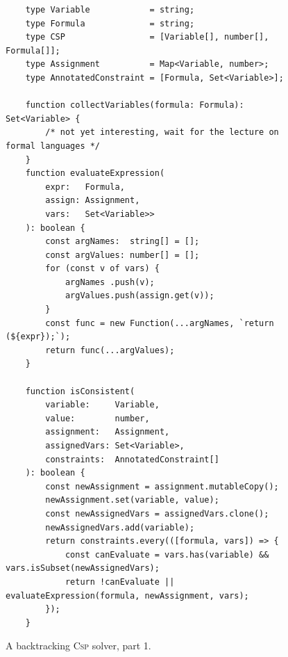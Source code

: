 \begin{figure}[!ht]
\centering
\begin{verbatim}
    type Variable            = string;
    type Formula             = string;
    type CSP                 = [Variable[], number[], Formula[]];          
    type Assignment          = Map<Variable, number>;
    type AnnotatedConstraint = [Formula, Set<Variable>];
    
    function collectVariables(formula: Formula): Set<Variable> {
        /* not yet interesting, wait for the lecture on formal languages */
    }
    function evaluateExpression(
        expr:   Formula, 
        assign: Assignment, 
        vars:   Set<Variable>>
    ): boolean {
        const argNames:  string[] = [];
        const argValues: number[] = [];
        for (const v of vars) {
            argNames .push(v);
            argValues.push(assign.get(v));
        }
        const func = new Function(...argNames, `return (${expr});`);
        return func(...argValues);
    }
      
    function isConsistent(
        variable:     Variable,
        value:        number,
        assignment:   Assignment,
        assignedVars: Set<Variable>,
        constraints:  AnnotatedConstraint[]
    ): boolean {
        const newAssignment = assignment.mutableCopy();
        newAssignment.set(variable, value);
        const newAssignedVars = assignedVars.clone();
        newAssignedVars.add(variable);
        return constraints.every(([formula, vars]) => {
            const canEvaluate = vars.has(variable) && vars.isSubset(newAssignedVars);
            return !canEvaluate || evaluateExpression(formula, newAssignment, vars);
        });
    }
\end{verbatim}
\vspace*{-0.3cm}
\caption{A backtracking \textsc{Csp} solver, part 1.}
\label{fig:CSP-Solver.ipynb-1}
\end{figure} %

